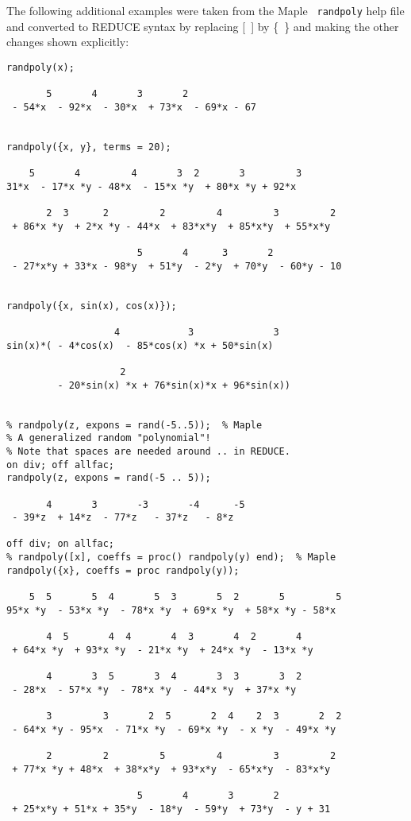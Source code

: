 The following additional examples were taken from the Maple {\tt
randpoly} help file and converted to REDUCE syntax by replacing [~] by
\{~\} and making the other changes shown explicitly:
\begin{verbatim}
randpoly(x);

       5       4       3       2
 - 54*x  - 92*x  - 30*x  + 73*x  - 69*x - 67


randpoly({x, y}, terms = 20);

    5       4         4       3  2       3         3
31*x  - 17*x *y - 48*x  - 15*x *y  + 80*x *y + 92*x

       2  3      2         2         4         3         2
 + 86*x *y  + 2*x *y - 44*x  + 83*x*y  + 85*x*y  + 55*x*y

                       5       4      3       2
 - 27*x*y + 33*x - 98*y  + 51*y  - 2*y  + 70*y  - 60*y - 10


randpoly({x, sin(x), cos(x)});

                   4            3              3
sin(x)*( - 4*cos(x)  - 85*cos(x) *x + 50*sin(x)

                    2
         - 20*sin(x) *x + 76*sin(x)*x + 96*sin(x))


% randpoly(z, expons = rand(-5..5));  % Maple
% A generalized random "polynomial"!
% Note that spaces are needed around .. in REDUCE.
on div; off allfac;
randpoly(z, expons = rand(-5 .. 5));

       4       3       -3       -4      -5
 - 39*z  + 14*z  - 77*z   - 37*z   - 8*z

off div; on allfac;
% randpoly([x], coeffs = proc() randpoly(y) end);  % Maple
randpoly({x}, coeffs = proc randpoly(y));

    5  5       5  4       5  3       5  2       5         5
95*x *y  - 53*x *y  - 78*x *y  + 69*x *y  + 58*x *y - 58*x

       4  5       4  4       4  3       4  2       4
 + 64*x *y  + 93*x *y  - 21*x *y  + 24*x *y  - 13*x *y

       4       3  5       3  4       3  3       3  2
 - 28*x  - 57*x *y  - 78*x *y  - 44*x *y  + 37*x *y

       3         3       2  5       2  4    2  3       2  2
 - 64*x *y - 95*x  - 71*x *y  - 69*x *y  - x *y  - 49*x *y

       2         2         5         4         3         2
 + 77*x *y + 48*x  + 38*x*y  + 93*x*y  - 65*x*y  - 83*x*y

                       5       4       3       2
 + 25*x*y + 51*x + 35*y  - 18*y  - 59*y  + 73*y  - y + 31



\end{verbatim}

